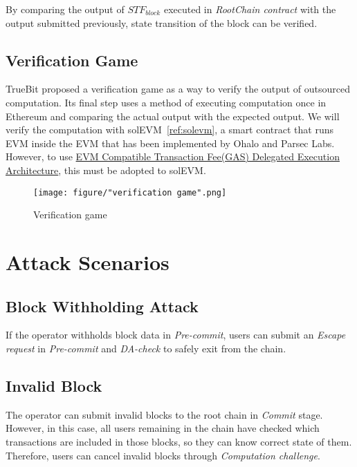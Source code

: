 \documentclass[letterpaper, 11pt]{article}
\begin{document}
\begin{CJK}{UTF8}{mj}
\begin{CJK}{UTF8}{mj}
By comparing the output of $STF_{block}$ executed in \emph{RootChain contract} with the output submitted previously, state transition of the block can be verified.
\end{CJK}

\subsection{Verification Game}
\begin{CJK}{UTF8}{mj}
TrueBit proposed a verification game as a way to verify the output of outsourced computation. Its final step uses a method of executing computation once in Ethereum and comparing the actual output with the expected output. We will verify the computation with solEVM~\ref{ref:solevm}, a smart contract that runs EVM inside the EVM that has been implemented by Ohalo and Parsec Labs. However, to use \href{https://hackmd.io/s/SkxNKAXU7}{EVM Compatible Transaction Fee(GAS) Delegated Execution Architecture}, this must be adopted to solEVM.
\end{CJK}

\begin{figure}[!h]
\centering
\texttt{[image: figure/"verification game".png]}
\caption{Verification game}
\label{fig:figure5}
\end{figure}
\end{CJK}


\section{Attack Scenarios}
\begin{CJK}{UTF8}{mj}

\end{CJK}

\subsection{Block Withholding Attack}
\begin{CJK}{UTF8}{mj}
If the operator withholds block data in \emph{Pre-commit}, users can submit an \emph{Escape request} in \emph{Pre-commit} and \emph{DA-check} to safely exit from the chain.
\end{CJK}

\subsection{Invalid Block}
\begin{CJK}{UTF8}{mj}
The operator can submit invalid blocks to the root chain in \emph{Commit} stage. However, in this case, all users remaining in the chain have checked which transactions are included in those blocks, so they can know correct state of them. Therefore, users can cancel invalid blocks through \emph{Computation challenge}.
\end{CJK}
\end{document}
